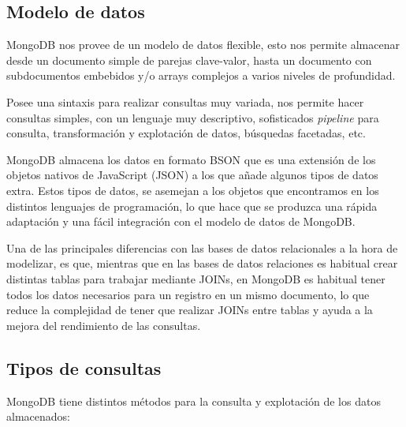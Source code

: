 \subsection{Modelo de datos}\label{datamodelmongo}

MongoDB nos provee de un modelo de datos flexible, esto nos permite almacenar desde un documento simple de parejas clave-valor, hasta un documento con subdocumentos embebidos y/o arrays complejos a varios niveles de profundidad.

Posee una sintaxis para realizar consultas muy variada, nos permite hacer consultas simples, con un lenguaje muy descriptivo, sofisticados \textit{pipeline} para consulta, transformación y explotación de datos, búsquedas facetadas, etc.

MongoDB almacena los datos en formato BSON \cite{bsonspec} que es una extensión de los objetos nativos de JavaScript (JSON) a los que añade algunos tipos de datos extra. Estos tipos de datos, se asemejan a los objetos que encontramos en los distintos lenguajes de programación, lo que hace que se produzca una rápida adaptación y una fácil integración con el modelo de datos de MongoDB.

Una de las principales diferencias con las bases de datos relacionales a la hora de modelizar, es que, mientras que en las bases de datos relaciones es habitual crear distintas tablas para trabajar mediante JOINs, en MongoDB es habitual tener todos los datos necesarios para un registro en un mismo documento, lo que reduce la complejidad de tener que realizar JOINs entre tablas y ayuda a la mejora del rendimiento de las consultas.

\subsection{Tipos de consultas}

MongoDB tiene distintos métodos para la consulta y explotación de los datos almacenados:

